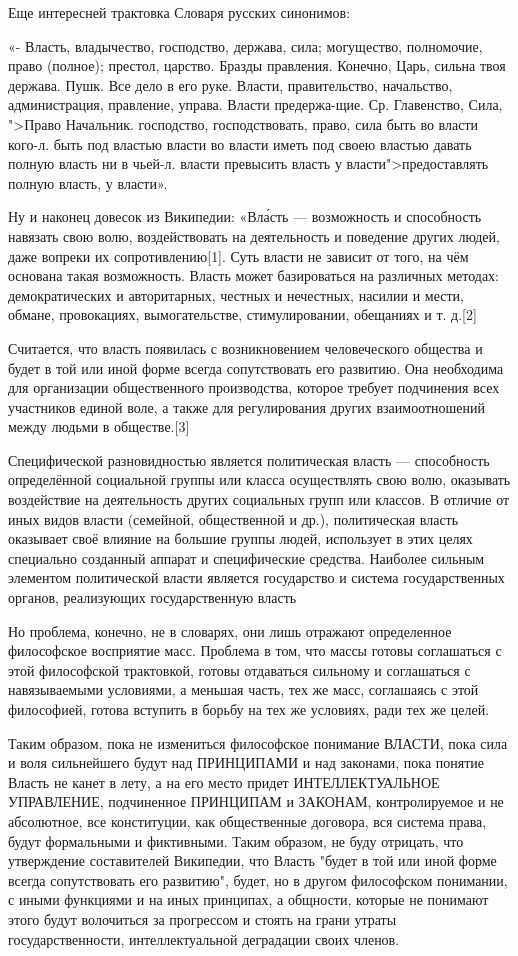 Еще интересней трактовка Словаря русских синонимов: 

«- Власть, владычество, господство, держава, сила; могущество, полномочие,
право (полное); престол, царство. Бразды правления. Конечно, Царь, сильна твоя
держава. Пушк. Все дело в его руке. Власти, правительство, начальство,
администрация, правление, управа. Власти предержа-щие. Ср. Главенство, Сила,
">Право Начальник. господство, господствовать, право, сила быть во власти
кого-л. быть под властью власти во власти иметь под своею властью давать полную
власть ни в чьей-л. власти превысить власть у власти">предоставлять полную
власть, у власти».

Ну и наконец довесок из Википедии: «Вла́сть — возможность и способность
навязать свою волю, воздействовать на деятельность и поведение других
людей, даже вопреки их сопротивлению[1]. Суть власти не зависит от того,
на чём основана такая возможность. Власть может базироваться на различных
методах: демократических и авторитарных, честных и нечестных, насилии и
мести, обмане, провокациях, вымогательстве, стимулировании, обещаниях и т.
д.[2]

Считается, что власть появилась с возникновением человеческого общества и будет
в той или иной форме всегда сопутствовать его развитию. Она необходима для
организации общественного производства, которое требует подчинения всех
участников единой воле, а также для регулирования других взаимоотношений между
людьми в обществе.[3]

Специфической разновидностью является политическая власть — способность
определённой социальной группы или класса осуществлять свою волю, оказывать
воздействие на деятельность других социальных групп или классов. В отличие от
иных видов власти (семейной, общественной и др.), политическая власть оказывает
своё влияние на большие группы людей, использует в этих целях специально
созданный аппарат и специфические средства. Наиболее сильным элементом
политической власти является государство и система государственных органов,
реализующих государственную власть

Но проблема, конечно, не в словарях, они лишь отражают определенное
философское восприятие масс. Проблема в том, что массы готовы соглашаться с
этой философской трактовкой, готовы отдаваться сильному и соглашаться с
навязываемыми условиями, а меньшая часть, тех же масс, соглашаясь с этой
философией, готова вступить в борьбу на тех же условиях, ради тех же целей.  

Таким образом, пока не измениться философское понимание ВЛАСТИ, пока сила и
воля сильнейшего будут над ПРИНЦИПАМИ и над законами, пока понятие Власть не
канет в лету, а на его место придет  ИНТЕЛЛЕКТУАЛЬНОЕ УПРАВЛЕНИЕ,
подчиненное ПРИНЦИПАМ и ЗАКОНАМ, контролируемое и не абсолютное, все
конституции, как общественные договора, вся система права, будут формальными
и фиктивными. Таким образом, не буду отрицать, что утверждение составителей
Википедии, что Власть "будет в той или иной форме всегда сопутствовать его
развитию", будет, но в другом философском понимании, с иными функциями и на
иных принципах, а общности, которые не понимают этого будут волочиться за
прогрессом и стоять на грани утраты государственности, интеллектуальной
деградации своих членов.

